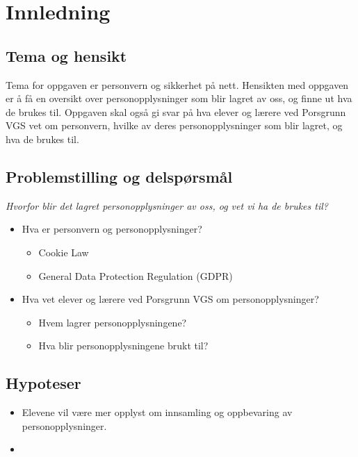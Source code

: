 \section{Innledning}

\subsection{Tema og hensikt}
Tema for oppgaven er personvern og sikkerhet på nett. Hensikten med oppgaven er å få en oversikt over personopplysninger som blir lagret av oss, og finne ut hva de brukes til. Oppgaven skal også gi svar på hva elever og lærere ved Porsgrunn VGS vet om personvern, hvilke av deres personopplysninger som blir lagret, og hva de brukes til.

\subsection{Problemstilling og delspørsmål}\label{subsec:problemstilling}

\textit{Hvorfor blir det lagret personopplysninger av oss, og vet vi ha de brukes til?}

\begin{itemize}
    \item Hva er personvern og personopplysninger?
    \begin{itemize}
        \item Cookie Law
        \item General Data Protection Regulation (GDPR)
    \end{itemize}
    \item Hva vet elever og lærere ved Porsgrunn VGS om personopplysninger?
    \begin{itemize}
        \item Hvem lagrer personopplysningene?
        \item Hva blir personopplysningene brukt til?
    \end{itemize}
\end{itemize}

\subsection{Hypoteser}\label{subsec:hypoteser}
\begin{itemize}
    \item Elevene vil være mer opplyst om innsamling og oppbevaring av personopplysninger.
    \item 
\end{itemize}

\newpage